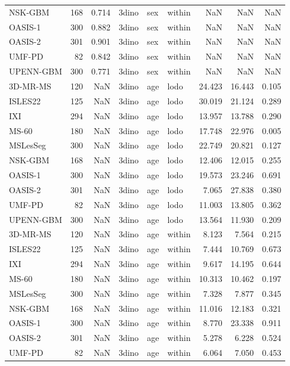 \begin{tabular}{lrrlllrrr}
NSK-GBM & 168 & 0.714 & 3dino & sex & within & NaN & NaN & NaN \\
OASIS-1 & 300 & 0.882 & 3dino & sex & within & NaN & NaN & NaN \\
OASIS-2 & 301 & 0.901 & 3dino & sex & within & NaN & NaN & NaN \\
UMF-PD & 82 & 0.842 & 3dino & sex & within & NaN & NaN & NaN \\
UPENN-GBM & 300 & 0.771 & 3dino & sex & within & NaN & NaN & NaN \\
3D-MR-MS & 120 & NaN & 3dino & age & lodo & 24.423 & 16.443 & 0.105 \\
ISLES22 & 125 & NaN & 3dino & age & lodo & 30.019 & 21.124 & 0.289 \\
IXI & 294 & NaN & 3dino & age & lodo & 13.957 & 13.788 & 0.290 \\
MS-60 & 180 & NaN & 3dino & age & lodo & 17.748 & 22.976 & 0.005 \\
MSLesSeg & 300 & NaN & 3dino & age & lodo & 22.749 & 20.821 & 0.127 \\
NSK-GBM & 168 & NaN & 3dino & age & lodo & 12.406 & 12.015 & 0.255 \\
OASIS-1 & 300 & NaN & 3dino & age & lodo & 19.573 & 23.246 & 0.691 \\
OASIS-2 & 301 & NaN & 3dino & age & lodo & 7.065 & 27.838 & 0.380 \\
UMF-PD & 82 & NaN & 3dino & age & lodo & 11.003 & 13.805 & 0.362 \\
UPENN-GBM & 300 & NaN & 3dino & age & lodo & 13.564 & 11.930 & 0.209 \\
3D-MR-MS & 120 & NaN & 3dino & age & within & 8.123 & 7.564 & 0.215 \\
ISLES22 & 125 & NaN & 3dino & age & within & 7.444 & 10.769 & 0.673 \\
IXI & 294 & NaN & 3dino & age & within & 9.617 & 14.195 & 0.644 \\
MS-60 & 180 & NaN & 3dino & age & within & 10.313 & 10.462 & 0.197 \\
MSLesSeg & 300 & NaN & 3dino & age & within & 7.328 & 7.877 & 0.345 \\
NSK-GBM & 168 & NaN & 3dino & age & within & 11.016 & 12.183 & 0.321 \\
OASIS-1 & 300 & NaN & 3dino & age & within & 8.770 & 23.338 & 0.911 \\
OASIS-2 & 301 & NaN & 3dino & age & within & 5.278 & 6.228 & 0.524 \\
UMF-PD & 82 & NaN & 3dino & age & within & 6.064 & 7.050 & 0.453 \\

\end{tabular}
